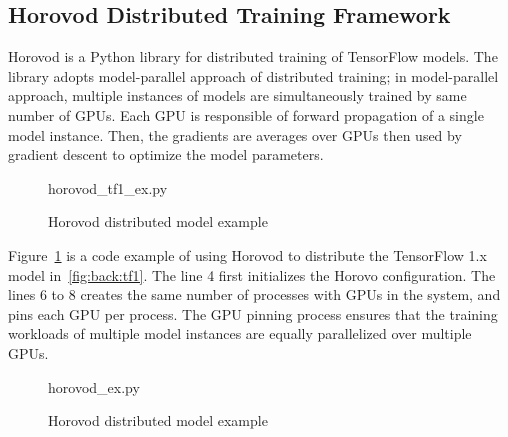 \subsection{Horovod Distributed Training Framework}

Horovod is a Python library for distributed training of TensorFlow models.
The library adopts model-parallel approach of distributed training;
in model-parallel approach, multiple instances of models are simultaneously
trained by same number of GPUs.
Each GPU is responsible of forward propagation of a single model instance.
Then, the gradients are averages over GPUs then used by gradient descent
to optimize the model parameters. 

\begin{figure}[ht!]
 
{horovod_tf1_ex.py}
  \caption{Horovod distributed model example}
\label{fig:back:hvd1} 
\end{figure}

Figure~\ref{fig:back:hvd1} is a code example of using Horovod to distribute
the TensorFlow 1.x model in~\ref{fig:back:tf1}.
The line 4 first initializes the Horovo configuration.
The lines 6 to 8 creates the same number of processes with GPUs in the system,
and pins each GPU per process. 
The GPU pinning process ensures that the training workloads of multiple
model instances are equally parallelized over multiple GPUs.


\begin{figure}[ht!]
 
{horovod_ex.py}
  \caption{Horovod distributed model example}
\label{fig:back:hvd2} 
\end{figure}


